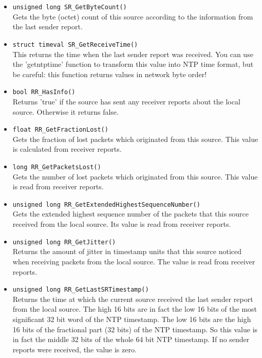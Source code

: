 \begin{itemize}
\item {\tt unsigned long SR\_GetByteCount()}\\
	Gets the byte (octet) count of this source according to the
	information from the last sender report.

\item {\tt struct timeval SR\_GetReceiveTime()}\\
 	This returns the time when the last sender report was received. You
 	can use the 'getntptime' function to transform this value into NTP
 	time format, but be careful: this function returns values in network
 	byte order!

\item {\tt bool RR\_HasInfo()}\\
	Returns 'true' if the source has sent any receiver reports about
	the local source. Otherwise it returns false.

\item {\tt float RR\_GetFractionLost()}\\
	Gets the fraction of lost packets which originated from this source.
	This value is calculated from receiver reports.

\item {\tt long RR\_GetPacketsLost()}\\
	Gets the number of lost packets which originated from this source.
	This value is read from receiver reports.
	
\item {\tt unsigned long RR\_GetExtendedHighestSequenceNumber()}\\
	Gets the extended highest sequence number of the packets that this
	source received from the local source. Its value is read from
	receiver reports.

\item {\tt unsigned long RR\_GetJitter()}\\
	Returns the amount of jitter in timestamp units that this source
	noticed when receiving packets from the local source. The value is
	read from receiver reports.

\item {\tt unsigned long RR\_GetLastSRTimestamp()}\\
	Returns the time at which the current source received the last
	sender report from the local source. The high 16 bits are in fact
	the low 16 bits of the most significant 32 bit word of the NTP
	timestamp. The low 16 bits are the high 16 bits of the fractional
	part (32 bits) of the NTP timestamp. So this value is in fact the
	middle 32 bits of the whole 64 bit NTP timestamp. If no sender
	reports were received, the value is zero.


\end{itemize}
